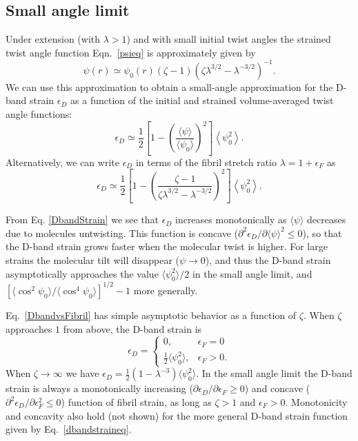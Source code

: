\documentclass[preprint,12pt]{elsarticle}
\begin{document}
\subsection{Small angle limit}
Under extension (with $\lambda>1$) and with small initial twist angles the strained twist angle function Eqn.~\ref{psieq} is approximately given by \cite{Leighton:2021b}
\begin{equation}\label{smallangle}
\psi(r) \simeq \psi_0(r) (\zeta-1)\left(\zeta\lambda^{3/2} - \lambda^{-3/2}\right)^{-1}.
\end{equation}
We can use this approximation to obtain a small-angle approximation for the D-band strain $\epsilon_D$ as a function of the initial and strained volume-averaged twist angle functions:
\begin{equation}\label{DbandStrain}
\epsilon_D \simeq \frac{1}{2}\left[ 1 - \left( \frac{\langle \psi\rangle}{\langle\psi_0\rangle}\right)^2\right]\left\langle \psi_0^2\right\rangle.
\end{equation}
Alternatively, we can write $\epsilon_D$
in terms of the fibril stretch ratio $\lambda= 1 + \epsilon_F$ as
\begin{equation}\label{DbandvsFibril}
\epsilon_D \simeq \frac{1}{2}\left[ 1 - \left( \frac{\zeta - 1}{\zeta\lambda^{3/2} - \lambda^{-3/2}}\right)^2\right]\left\langle \psi_0^2\right\rangle.
\end{equation}

From Eq. \ref{DbandStrain} we see that $\epsilon_D$ increases monotonically as $\langle\psi\rangle$ decreases due to molecules untwisting. This function is concave ($\partial^2 \epsilon_D/\partial \langle\psi\rangle^2\leq0$), so that the D-band strain grows faster when the molecular twist is higher. For large strains the molecular tilt will disappear ($\psi\to 0$), and thus the D-band strain asymptotically approaches the value $\langle\psi_0^2\rangle/2$ in the small angle limit, and $\left[\langle\cos^2\psi_0\rangle/\langle\cos^4\psi_0\rangle\right]^{1/2} - 1$ more generally. 

Eq.~\ref{DbandvsFibril} has simple asymptotic behavior as a function of $\zeta$. When  $\zeta$ approaches $1$ from above, the D-band strain is 
\begin{equation}
\epsilon_D = \begin{cases} 
0, & \epsilon_F=0\\
\frac{1}{2}\langle\psi_0^2\rangle, & \epsilon_F>0.
\end{cases}
\end{equation}
When $\zeta\to\infty$ we have $\epsilon_D = \frac{1}{2}\left(1 - \lambda^{-3}\right)\langle\psi_0^2\rangle$. In the small angle limit the D-band strain is always a monotonically increasing ($\partial \epsilon_D/\partial\epsilon_F \geq0$) and concave ($\partial^2 \epsilon_D/\partial\epsilon_F^2 \leq0$) function of fibril strain, as long as $\zeta>1$ and $\epsilon_F>0$.  Monotonicity and concavity also hold (not shown) for the more general D-band strain function given by Eq.~\ref{dbandstraineq}.
\end{document}
